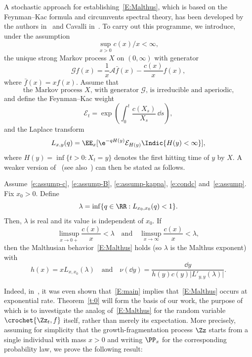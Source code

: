 A stochastic approach for establishing~\eqref{E:Malthus}, which is based on the Feynman--Kac formula and circumvents spectral theory, has been developed by the authors in~\cite{ BeFK,BW} and Cavalli in~\cite{Cavalli}. To carry out this programme, we introduce, under the assumption
\begin{equation}\label{e:condc}
\sup_{x>0} c(x)/x<\infty,
\end{equation}
the unique strong Markov process $X$ on $(0,\infty)$ with generator
\[
\mathcal{G} f (x) = \frac{1}{x} \mathcal{A}\bar{f}(x) - \frac{c(x)}{x} f(x),
\]
where $\bar{f}(x) = x f(x)$. Assume that
\begin{equation}\label{e:assump}
\text{the Markov process $X$, with generator $\mathcal{G}$, is irreducible and aperiodic,}
\end{equation}
and define the Feynman--Kac weight
\[
\mathcal{E}_t = \exp\left(\int_0^t \frac{c(X_s)}{X_s} \, \dd s\right),
\]
and the Laplace transform
\[
L_{x,y}(q)
= \EE_x[\e^{- qH(y)} \mathcal{E}_{H(y)} \Indic{H(y)<\infty}],
\]
where $H(y)=\inf\{t>0: X_t=y\}$ denotes the first hitting time of $y$ by $X$. A weaker version of~\cite[Theorem~1.2] {BeFK} (see also~\cite[Theorem~1.1]{BW}) can then be stated as follows.

\setcounter{cdrthm}{-1}
\begin{theo}\label{t:0}
Assume~\eqref{e:assump-c}, \eqref{e:assump-B}, \eqref{e:assump-kappa}, \eqref{e:condc} and~\eqref{e:assump}. Fix $x_0 > 0$. Define
\[
\lambda = \inf\{q\in \RR: L_{x_0,x_0}(q) < 1\}.
\]
Then, $\lambda$ is real and its value is independent of $x_0$. If
\begin{equation}\label{E:main}
\limsup _{x\to 0+} \frac{c(x)}{x}< \lambda \quad\text{and}\quad \limsup _{x\to \infty} \frac{c(x)}{x}<\lambda,
\end{equation}
then the Malthusian behavior~\eqref{E:Malthus} holds (so $\lambda$ is the Malthus exponent) with
\[
h(x) = xL_{x,x_0}(\lambda) \quad \text{and} \quad
\nu(\dd y) = \frac{\dd y}{h(y)c(y) \lvert L'_{y,y}(\lambda)\rvert}.
\]
\end{theo}

Indeed, in~\cite{BeFK}, it was even shown that~\eqref{E:main} implies that~\eqref{E:Malthus} occurs at exponential rate. Theorem~\ref{t:0} will form the basis of our work, the purpose of which is to investigate the analog of~\eqref{E:Malthus} for the random variable $\crochet{ \Zz_t,f}$ itself, rather than merely its expectation. More precisely, assuming for simplicity that the growth-fragmentation process $\Zz$ starts from a single individual with mass $x>0$ and writing $\PP_x$ for the corresponding probability law, we prove the following result:

